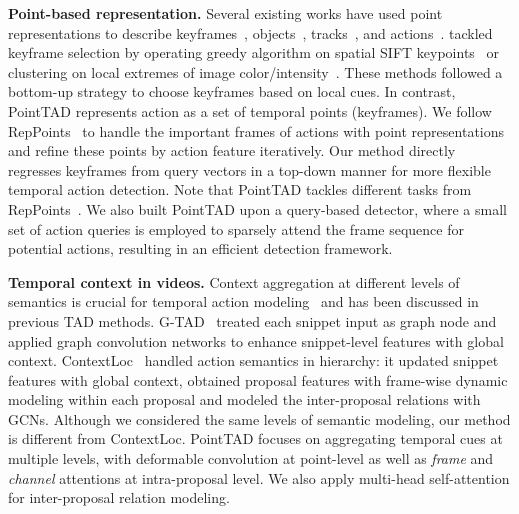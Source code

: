 \documentclass{article}
\renewcommand{\paragraph}[1]{\vspace{1.25mm}\noindent\textbf{#1}}
\begin{document}
\paragraph{Point-based representation.}
Several existing works have used point representations to describe keyframes~\cite{DBLP:journals/tcsv/GuanWLDF13,DBLP:journals/ijon/TangLXS19}, objects~\cite{DBLP:conf/iccv/YangLHWL19,DBLP:journals/corr/abs-2203-16507}, tracks~\cite{DBLP:conf/eccv/ZhouKK20}, and actions~\cite{DBLP:conf/eccv/LiW0W20}. \cite{DBLP:journals/tcsv/GuanWLDF13,DBLP:journals/ijon/TangLXS19} tackled keyframe selection by operating greedy algorithm on spatial SIFT keypoints~\cite{DBLP:journals/tcsv/GuanWLDF13} or clustering on local extremes of image color/intensity~\cite{DBLP:journals/ijon/TangLXS19}. These methods followed a bottom-up strategy to choose keyframes based on local cues. In contrast, PointTAD represents action as a set of temporal points (keyframes). We follow RepPoints~\cite{DBLP:conf/iccv/YangLHWL19} to handle the important frames of actions with point representations and refine these points by action feature iteratively. Our method directly regresses keyframes from query vectors in a top-down manner for more flexible temporal action detection. Note that PointTAD tackles different tasks from RepPoints~\cite{DBLP:conf/iccv/YangLHWL19}. We also built PointTAD upon a query-based detector, where a small set of action queries is employed to sparsely attend the frame sequence for potential actions, resulting in an efficient detection framework.

\paragraph{Temporal context in videos.}
Context aggregation at different levels of semantics is crucial for temporal action modeling~\cite{DBLP:conf/cvpr/0002TJW21} and has been discussed in previous TAD methods. G-TAD~\cite{DBLP:conf/cvpr/XuZRTG20} treated each snippet input as graph node and applied graph convolution networks to enhance snippet-level features with global context. ContextLoc~\cite{DBLP:conf/iccv/ZhuT00021} handled action semantics in hierarchy: it updated snippet features with global context, obtained proposal features with frame-wise dynamic modeling within each proposal and modeled the inter-proposal relations with GCNs. Although we considered the same levels of semantic modeling, our method is different from ContextLoc. PointTAD focuses on aggregating temporal cues at multiple levels, with deformable convolution at point-level as well as {\em frame} and {\em channel} attentions at intra-proposal level. We also apply multi-head self-attention for inter-proposal relation modeling.
\end{document}
